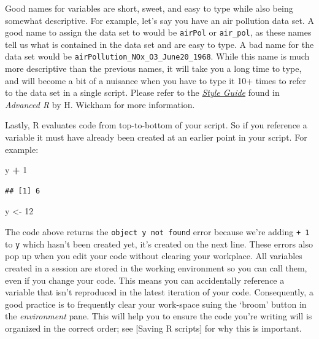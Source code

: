 \documentclass[
]{book}
\newenvironment{Shaded}{\begin{snugshade}}{\end{snugshade}}
\newcommand{\DecValTok}[1]{\textcolor[rgb]{0.00,0.00,0.81}{#1}}
\newcommand{\NormalTok}[1]{#1}
\newcommand{\OtherTok}[1]{\textcolor[rgb]{0.56,0.35,0.01}{#1}}
\newcommand{\SpecialCharTok}[1]{\textcolor[rgb]{0.81,0.36,0.00}{\textbf{#1}}}
\begin{document}
Good names for variables are short, sweet, and easy to type while also being somewhat descriptive. For example, let's say you have an air pollution data set. A good name to assign the data set to would be \texttt{airPol} or \texttt{air\_pol}, as these names tell us what is contained in the data set and are easy to type. A bad name for the data set would be \texttt{airPollution\_NOx\_O3\_June20\_1968}. While this name is much more descriptive than the previous names, it will take you a long time to type, and will become a bit of a nuisance when you have to type it 10+ times to refer to the data set in a single script. Please refer to the \href{http://adv-r.had.co.nz/Style.html}{\emph{Style Guide}} found in \emph{Advanced R} by H. Wickham for more information.

Lastly, R evaluates code from top-to-bottom of your script. So if you reference a variable it must have already been created at an earlier point in your script. For example:

\begin{Shaded}
\begin{Highlighting}[]
\NormalTok{y }\SpecialCharTok{+} \DecValTok{1}
\end{Highlighting}
\end{Shaded}

\begin{verbatim}
## [1] 6
\end{verbatim}

\begin{Shaded}
\begin{Highlighting}[]
\NormalTok{y }\OtherTok{\textless{}{-}} \DecValTok{12}
\end{Highlighting}
\end{Shaded}

The code above returns the \texttt{object\ \textquotesingle{}y\textquotesingle{}\ not\ found} error because we're adding \texttt{+\ 1} to \texttt{y} which hasn't been created yet, it's created on the next line. These errors also pop up when you edit your code without clearing your workplace. All variables created in a session are stored in the working environment so you can call them, even if you change your code. This means you can accidentally reference a variable that isn't reproduced in the latest iteration of your code. Consequently, a good practice is to frequently clear your work-space suing the `broom' button in the \emph{environment} pane. This will help you to ensure the code you're writing will is organized in the correct order; see {[}Saving R scripts{]} for why this is important.
\end{document}
